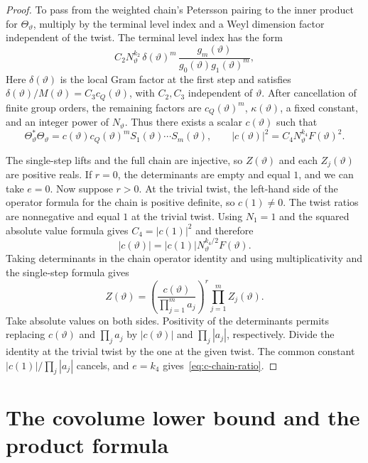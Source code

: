 \begin{proof}
To pass from the weighted chain's Petersson pairing to the inner product for $\Theta_\vartheta$, multiply by the terminal level index and a Weyl dimension factor independent of the twist. The terminal level index has the form
\[
 C_2 N_\vartheta^{k_2}\,\delta(\vartheta)^m\,
     \frac{g_m(\vartheta)}{g_0(\vartheta)g_1(\vartheta)^m},
\]
Here $\delta(\vartheta)$ is the local Gram factor at the first step and satisfies $\delta(\vartheta)/M(\vartheta)=C_3c_Q(\vartheta)$, with $C_2,C_3$ independent of $\vartheta$. After cancellation of finite group orders, the remaining factors are $c_Q(\vartheta)^m$, $\kappa(\vartheta)$, a fixed constant, and an integer power of $N_\vartheta$. Thus there exists a scalar $c(\vartheta)$ such that
\[
 \Theta_\vartheta^*\Theta_\vartheta
   =c(\vartheta)c_Q(\vartheta)^m S_1(\vartheta)\cdots S_m(\vartheta),
 \qquad
 |c(\vartheta)|^2=C_4N_\vartheta^{k_4}F(\vartheta)^2 .
\]

The single-step lifts and the full chain are injective, so $Z(\vartheta)$ and each $Z_j(\vartheta)$ are positive reals. If $r=0$, the determinants are empty and equal $1$, and we can take $e=0$. Now suppose $r>0$. At the trivial twist, the left-hand side of the operator formula for the chain is positive definite, so $c(1)\ne0$. The twist ratios are nonnegative and equal $1$ at the trivial twist. Using $N_1=1$ and the squared absolute value formula gives $C_4=|c(1)|^2$ and therefore
\[
 |c(\vartheta)|=|c(1)|N_\vartheta^{k_4/2}F(\vartheta).
\]
Taking determinants in the chain operator identity and using multiplicativity and the single-step formula gives
\[
 Z(\vartheta)
 =\left(\frac{c(\vartheta)}{\prod_{j=1}^m a_j}\right)^r
       \prod_{j=1}^m Z_j(\vartheta).
\]
Take absolute values on both sides. Positivity of the determinants permits replacing $c(\vartheta)$ and $\prod_j a_j$ by $|c(\vartheta)|$ and $\prod_j |a_j|$, respectively. Divide the identity at the trivial twist by the one at the given twist. The common constant $|c(1)|/\prod_j |a_j|$ cancels, and $e=k_4$ gives~\eqref{eq:c-chain-ratio}.
\end{proof}

\section{The covolume lower bound and the product formula}
\label{sec:c-covolume}

